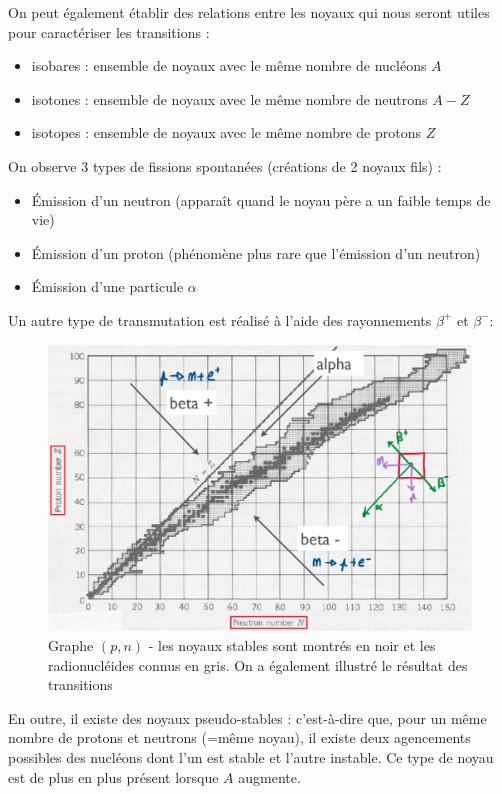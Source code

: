 On peut également établir des relations entre les noyaux qui nous seront utiles pour caractériser les transitions :
\begin{itemize}[label=$\bullet$]
    \item isobares : ensemble de noyaux avec le même nombre de nucléons $A$
    \item isotones : ensemble de noyaux avec le même nombre de neutrons $A-Z$
    \item isotopes : ensemble de noyaux avec le même nombre de protons $Z$ 
\end{itemize}
On observe 3 types de fissions spontanées (créations de 2 noyaux fils) :
\begin{itemize}[label=$\bullet$]
    \item Émission d'un neutron (apparaît quand le noyau père a un faible temps de vie)
    \item Émission d'un proton (phénomène plus rare que l'émission d'un neutron)
    \item Émission d'une particule $\alpha$
\end{itemize}
Un autre type de transmutation est réalisé à l'aide des rayonnements $\beta^+$ et $\beta^-$:
\begin{figure}[H]
    \centering
    \includegraphics[scale=0.3]{Images4/Stabilite_noyaux_2.png}
    \caption{Graphe $(p,n)$ - les noyaux stables sont montrés en noir et les radionucléides connus en gris. On a également illustré le résultat des transitions}
    \label{fig:Stabilité noyaux 1}
\end{figure}
En outre, il existe des noyaux pseudo-stables : c'est-à-dire que, pour un même nombre de protons et neutrons (=même noyau), il existe deux agencements possibles des nucléons dont l'un est stable et l'autre instable. Ce type de noyau est de plus en plus présent lorsque $A$ augmente.


